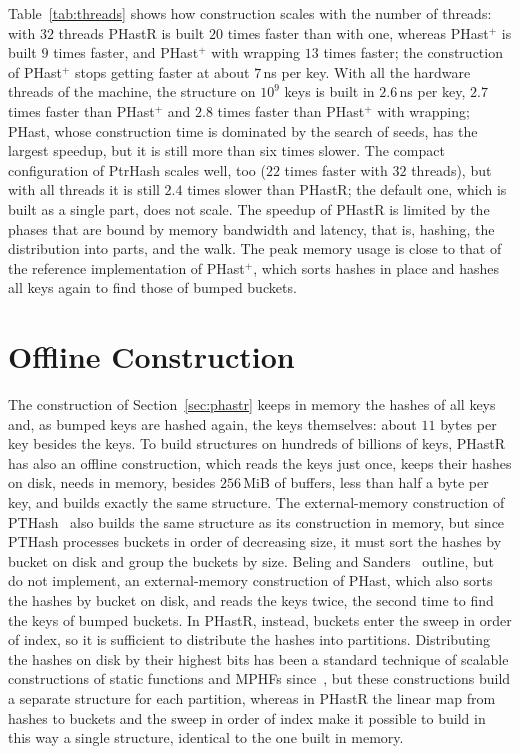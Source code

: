 \documentclass[11pt]{article}
\newcommand{\PHast}{PHast\xspace}
\newcommand{\PHastP}{PHast$^+$\xspace}
\newcommand{\PHastR}{PHastR\xspace}
\begin{document}
Table~\ref{tab:threads} shows how
construction scales with the number of threads: with $32$ threads \PHastR is
built $20$ times faster than with one, whereas \PHastP is built $9$ times
faster, and \PHastP with wrapping $13$ times faster; the construction of
\PHastP stops getting faster at about $7$\,ns per key. With all the hardware
threads of the machine, the structure on $10^9$ keys is built in $2.6$\,ns
per key, $2.7$ times faster than \PHastP and $2.8$ times faster than \PHastP
with wrapping; \PHast, whose construction time is dominated by the search of
seeds, has the largest speedup, but it is still more than six times slower.
The compact configuration of PtrHash scales well, too ($22$ times faster
with $32$ threads), but with all threads it is still $2.4$ times slower than
\PHastR; the default one, which is built as a single part, does not scale.
The speedup of \PHastR is limited by the phases that are bound by memory
bandwidth and latency, that is, hashing, the distribution into parts, and
the walk. The peak memory usage is close to that of
the reference implementation of \PHastP, which sorts hashes in place and
hashes all keys again to find those of bumped buckets.

\section{Offline Construction}
\label{sec:offline}

The construction of Section~\ref{sec:phastr} keeps in memory the hashes of all
keys and, as bumped keys are hashed again, the keys themselves: about $11$
bytes per key besides the keys. To build structures on hundreds of billions
of keys, \PHastR has also an offline construction, which reads the keys just
once, keeps their hashes on disk, needs in memory, besides $256$\,MiB of
buffers, less than half a byte per key, and builds exactly the same
structure. The external-memory construction of
PTHash~\cite{PTPEMCMPHFP} also builds the same structure as its construction
in memory, but since PTHash processes buckets in order of decreasing size, it
must sort the hashes by bucket on disk and group the buckets by size. Beling
and Sanders~\cite{BeSPHast} outline, but do not implement, an external-memory
construction of \PHast, which also sorts the hashes by bucket on disk, and
reads the keys twice, the second time to find the keys of bumped buckets. In
\PHastR, instead, buckets enter the sweep in order of index, so it is
sufficient to distribute the hashes into partitions. Distributing the hashes
on disk by their highest bits has been a standard technique of scalable
constructions of static functions and MPHFs since~\cite{BPZPPHNOS}, but
these constructions build a separate structure for each partition, whereas
in \PHastR the linear map from hashes to buckets and the sweep in order of
index make it possible to build in this way a single structure, identical to
the one built in memory.
\end{document}
